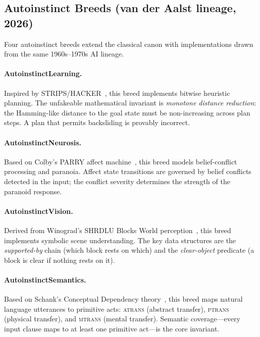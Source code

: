 \subsection{Autoinstinct Breeds (van der Aalst lineage, 2026)}
\label{subsec:autoinstinct}

Four autoinstinct breeds extend the classical canon with implementations drawn
from the same 1960s--1970s AI lineage.

\paragraph{AutoinstinctLearning.}
Inspired by STRIPS/HACKER~\cite{winston1975}, this breed implements bitwise
heuristic planning.  The unfakeable mathematical invariant is
\emph{monotone distance reduction}: the Hamming-like distance to the goal
state must be non-increasing across plan steps.  A plan that permits
backsliding is provably incorrect.

\paragraph{AutoinstinctNeurosis.}
Based on Colby's PARRY affect machine~\cite{colby1975}, this breed models
belief-conflict processing and paranoia.  Affect state transitions are
governed by belief conflicts detected in the input; the conflict severity
determines the strength of the paranoid response.

\paragraph{AutoinstinctVision.}
Derived from Winograd's SHRDLU Blocks World perception~\cite{winograd1972},
this breed implements symbolic scene understanding.  The key data structures
are the \emph{supported-by} chain (which block rests on which) and the
\emph{clear-object} predicate (a block is clear if nothing rests on it).

\paragraph{AutoinstinctSemantics.}
Based on Schank's Conceptual Dependency theory~\cite{schank1972}, this breed
maps natural language utterances to primitive acts: \textsc{atrans}
(abstract transfer), \textsc{ptrans} (physical transfer), and \textsc{mtrans}
(mental transfer).  Semantic coverage---every input clause maps to at least one
primitive act---is the core invariant.

